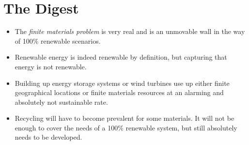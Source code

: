 \section{The Digest}

\begin{kaoboxgreen}[frametitle=Main Takeaways]

\begin{itemize}
\item The \emph{finite materials problem} is very real and is an unmovable wall in the way of 100\% renewable scenarios.
\item Renewable energy is indeed renewable by definition, but capturing that energy is not renewable.
\item Building up energy storage systems or wind turbines use up either finite geographical locations or finite materials resources at an alarming and absolutely not sustainable rate.
\item Recycling will have to become prevalent for some materials. It will not be enough to cover the needs of a 100\% renewable system, but still absolutely needs to be developed.
\end{itemize}
  
\end{kaoboxgreen}